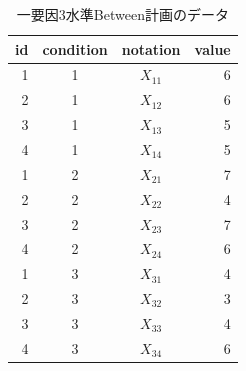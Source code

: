 \begin{table}[ht]
	\centering
	\caption{一要因3水準Between計画のデータ}
	\begin{tabular}{rccr}
		\hline
		id & condition & notation & value \\
		\hline
		1  & 1         & $X_{11}$ & 6     \\
		2  & 1         & $X_{12}$ & 6     \\
		3  & 1         & $X_{13}$ & 5     \\
		4  & 1         & $X_{14}$ & 5     \\
		1  & 2         & $X_{21}$ & 7     \\
		2  & 2         & $X_{22}$ & 4     \\
		3  & 2         & $X_{23}$ & 7     \\
		4  & 2         & $X_{24}$ & 6     \\
		1  & 3         & $X_{31}$ & 4     \\
		2  & 3         & $X_{32}$ & 3     \\
		3  & 3         & $X_{33}$ & 4     \\
		4  & 3         & $X_{34}$ & 6     \\
		\hline
	\end{tabular}
	\label{table::23_01}
\end{table}
